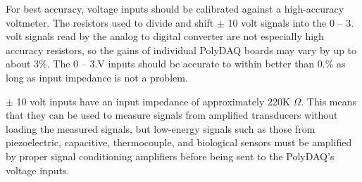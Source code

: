 For best accuracy, voltage inputs should be calibrated against a high-\/accuracy voltmeter. The resistors used to divide and shift $\pm$ 10 volt signals into the 0 -- 3. volt signals read by the analog to digital converter are not especially high accuracy resistors, so the gains of individual Poly\-D\-A\-Q boards may vary by up to about 3\%. The 0 -- 3.\-V inputs should be accurate to within better than 0.\% as long as input impedance is not a problem.

 $\pm$ 10 volt inputs have an input impedance of approximately 220\-K $\Omega$. This means that they can be used to measure signals from amplified transducers without loading the measured signals, but low-\/energy signals such as those from piezoelectric, capacitive, thermocouple, and biological sensors must be amplified by proper signal conditioning amplifiers before being sent to the Poly\-D\-A\-Q's voltage inputs.

